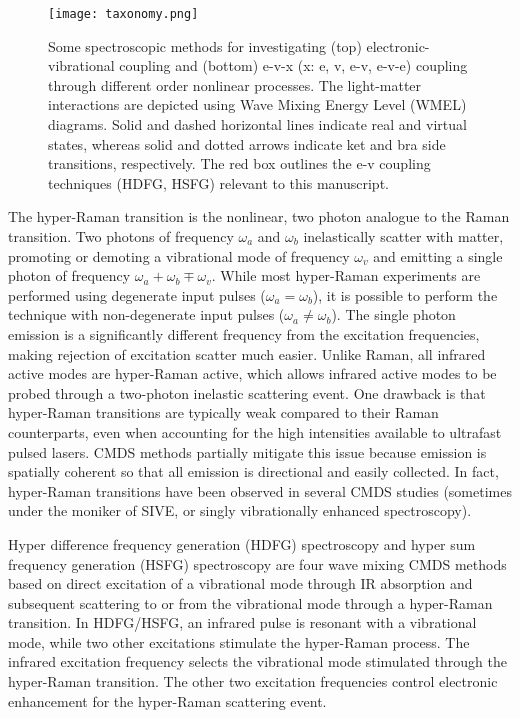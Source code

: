 \documentclass[aip, jcp, reprint, onecolumn, nofootinbib]{revtex4-2}
\begin{document}
\begin{figure}[!htbp]
	\centering
	\texttt{[image: taxonomy.png]}
	\caption{
		Some spectroscopic methods for investigating (top) electronic-vibrational coupling and (bottom) e-v-x (x: e, v, e-v, e-v-e) coupling through different order nonlinear processes.
		The light-matter interactions are depicted using Wave Mixing Energy Level (WMEL) diagrams.\cite{RN286}
		Solid and dashed horizontal lines indicate real and virtual states, whereas solid and dotted arrows indicate ket and bra side transitions, respectively. 
		The red box outlines the e-v coupling techniques (HDFG, HSFG) relevant to this manuscript.
	} 
	\label{fig:comparisonwmel}
\end{figure}

The hyper-Raman transition is the nonlinear, two photon analogue to the Raman transition.\cite{Terhune1965, Cyvin1965, Andrews1978}
Two photons of frequency $\omega_a$ and $\omega_b$ inelastically scatter with matter, promoting or demoting a vibrational mode of frequency $\omega_v$ and emitting a single photon of frequency $\omega_a + \omega_b \mp \omega_v$. 
While most hyper-Raman experiments are performed using degenerate input pulses ($\omega_a = \omega_b$),\cite{RN515} it is possible to perform the technique with non-degenerate input pulses ($\omega_a \neq \omega_b$). \cite{Denisov1986, Kozich2007}
The single photon emission is a significantly different frequency from the excitation frequencies, making rejection of excitation scatter much easier.
Unlike Raman, all infrared active modes are hyper-Raman active, which allows infrared active modes to be probed through a two-photon inelastic scattering event. \cite{Andrews1978}
One drawback is that hyper-Raman transitions are typically weak compared to their Raman counterparts, even when accounting for the high intensities available to ultrafast pulsed lasers.\cite{RN515, Kelley2010}
CMDS methods partially mitigate this issue because emission is spatially coherent so that all emission is directional and easily collected.
In fact, hyper-Raman transitions have been observed in several CMDS studies (sometimes under the moniker of SIVE, or singly vibrationally enhanced spectroscopy).\cite{Zilian1994, RN350, RN351, RN352, RN353, Chen1998, RN362, RN418, Hanninen2018, Wang2021, Bonn2024, McDonnell2024}

Hyper difference frequency generation (HDFG) spectroscopy and hyper sum frequency generation (HSFG) spectroscopy are four wave mixing CMDS methods based on direct excitation of a vibrational mode through IR absorption and subsequent scattering to or from the vibrational mode through a hyper-Raman transition.
In HDFG/HSFG, an infrared pulse is resonant with a vibrational mode, while two other excitations stimulate the hyper-Raman process.
The infrared excitation frequency selects the vibrational mode stimulated through the hyper-Raman transition.
The other two excitation frequencies control electronic enhancement for the hyper-Raman scattering event.
\end{document}
